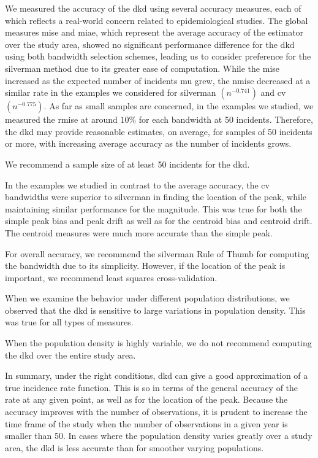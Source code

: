 We measured the accuracy of the \gls{dkd} using several accuracy measures,
each of which reflects a real-world concern related to epidemiological studies.
The global measures \gls{mise} and \gls{miae},
which represent the average accuracy of the estimator over the study area,
showed no significant performance difference
for the \gls{dkd} using both bandwidth selection schemes,
leading us to consider preference for the \gls{silverman} method due to its greater ease of computation.
While the \gls{mise} increased as the expected number of incidents \gls{mu} grew,
the \acrfull{nmise} decreased at a similar rate
in the examples we considered
for \gls{silverman} $(n^{-0.741})$ and \gls{cv} $(n^{-0.775})$.
As far as small samples are concerned,
in the examples we studied,
we measured the \acrfull{rmise} at around $10\%$ for each bandwidth at 50 incidents.
Therefore,
the \gls{dkd} may provide reasonable estimates,
on average,
for samples of 50 incidents or more,
with increasing average accuracy as the number of incidents grows.
\begin{rec}
    \label{rec:small-sample}
    We recommend a sample size of at least 50 incidents for the \gls{dkd}.
\end{rec}

In the examples we studied
in contrast to the average accuracy,
the \gls{cv} bandwidths were superior to \gls{silverman}
in finding the location of the peak,
while maintaining similar performance for the magnitude.
This was true for both the simple \gls{peak bias} and \gls{peak drift} as well as for the
\gls{centroid bias} and \gls{centroid drift}.
The centroid measures were much more accurate than the simple peak.
\begin{rec}
    \label{rec:bandwidth-scheme}
    For overall accuracy, we recommend the \gls{silverman} Rule of Thumb for computing the bandwidth due to its simplicity.
    However, if the location of the peak is important, we recommend least squares cross-validation.
\end{rec}

When we examine the behavior under different population distributions,
we observed that the \gls{dkd} is sensitive to large variations in population density.
This was true for all types of measures.
\begin{rec}
    \label{rec:pop-density}
    When the population density is highly variable,
    we do not recommend computing the \gls{dkd} over the entire study area.
\end{rec}

In summary,
under the right conditions,
\gls{dkd} can give a good approximation of a true \gls{incidence rate} function.
This is so in terms of the general accuracy of the rate at any given point,
as well as for the location of the peak.
Because the accuracy improves with the number of observations,
it is prudent to increase the time frame of the study when the number of observations in a given year is smaller than 50.
In cases where the population density varies greatly over a study area,
the \gls{dkd} is less accurate than for smoother varying populations.

